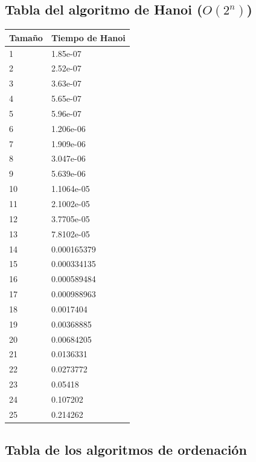 \documentclass[a4paper, 11pt]{article}
\begin{document}
\subsection{Tabla del algoritmo de Hanoi ($O(2^n)$)}
\begin{tabular}{|l|l|}
	\hline
	Tamaño & Tiempo de Hanoi \\
	\hline
	\hline
1&1.85e-07\\
\hline
2&2.52e-07\\
\hline
3&3.63e-07\\
\hline
4&5.65e-07\\
\hline
5&5.96e-07\\
\hline
6&1.206e-06\\
\hline
7&1.909e-06\\
\hline
8&3.047e-06\\
\hline
9&5.639e-06\\
\hline
10&1.1064e-05\\
\hline
11&2.1002e-05\\
\hline
12&3.7705e-05\\
\hline
13&7.8102e-05\\
\hline
14&0.000165379\\
\hline
15&0.000334135\\
\hline
16&0.000589484\\
\hline
17&0.000988963\\
\hline
18&0.0017404\\
\hline
19&0.00368885\\
\hline
20&0.00684205\\
\hline
21&0.0136331\\
\hline
22&0.0273772\\
\hline
23&0.05418\\
\hline
24&0.107202\\
\hline
25&0.214262\\
\hline

\end{tabular}


\subsection{Tabla de los algoritmos de ordenación}
\end{document}
